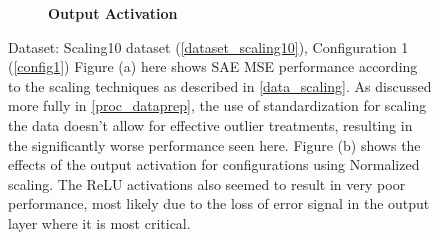 \documentclass[a4paper,11pt,oneside]{article}
\theoremstyle{plain}
\theoremstyle{definition}
\begin{document}
\begin{figure}[H]
\begin{subfigure}{.5\textwidth}
		\caption[MSE by Scaling and Output Activations (Actual Data) - Output Activation]{\textbf{Output Activation} 
			\newline }
		\label{figure-actual_mse_output}
	\end{subfigure}
	\caption[MSE by Scaling and Output Activations (Actual Data)]{Dataset: Scaling10 dataset (\ref{dataset_scaling10}), Configuration 1 (\ref{config1})
		\newline Figure (a) here shows SAE MSE performance according to the scaling techniques as described in \ref{data_scaling}. As discussed more fully in \ref{proc_dataprep}, the use of standardization for scaling the data doesn't allow for effective outlier treatments, resulting in the significantly worse performance seen here.
		\newline Figure (b) shows the effects of the output activation for configurations using Normalized scaling. The ReLU activations also seemed to result in very poor performance, most likely due to the loss of error signal in the output layer where it is most critical. }
	\label{figure-mse_scaling}
\end{figure}
\end{document}

